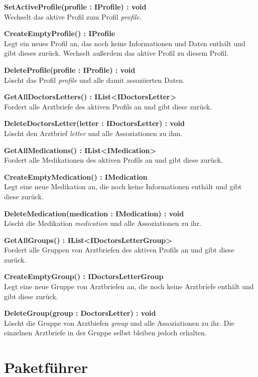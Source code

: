 \documentclass[a4paper]{scrreprt}
\begin{document}
\textbf{SetActiveProfile(profile : IProfile) : void}\\
Wechselt das aktive Profil zum Profil \textit{profile}.

\textbf{CreateEmptyProfile() : IProfile}\\
Legt ein neues Profil an, das noch keine Informationen und Daten enthält und gibt dieses zurück. Wechselt außerdem das aktive Profil zu diesem Profil.

\textbf{DeleteProfile(profile : IProfile) : void}\\
Löscht das Profil \textit{profile} und alle damit assoziierten Daten.

\textbf{GetAllDoctorsLetters() : IList<IDoctorsLetter>}\\
Fordert alle Arztbriefe des aktiven Profils an und gibt diese zurück.

\textbf{DeleteDoctorsLetter(letter : IDoctorsLetter) : void}\\
Löscht den Arztbrief \textit{letter} und alle Assoziationen zu ihm.

\textbf{GetAllMedications() : IList<IMedication>}\\
Fordert alle Medikationen des aktiven Profils an und gibt diese zurück.

\textbf{CreateEmptyMedication() : IMedication}\\
Legt eine neue Medikation an, die noch keine Informationen enthält und gibt diese zurück.

\textbf{DeleteMedication(medication : IMedication) : void}\\
Löscht die Medikation \textit{medication} und alle Assoziationen zu ihr.

\textbf{GetAllGroups() : IList<IDoctorsLetterGroup>}\\
Fordert alle Gruppen von Arztbriefen des aktiven Profils an und gibt diese zurück.

\textbf{CreateEmptyGroup() : IDoctorsLetterGroup}\\
Legt eine neue Gruppe von Arztbriefen an, die noch keine Arztbriefe enthält und gibt diese zurück.

\textbf{DeleteGroup(group : DoctorsLetter) : void}\\
Löscht die Gruppe von Arztbiefen \textit{group} und alle Assoziationen zu ihr. Die einzelnen Arztbriefe in der Gruppe selbst bleiben jedoch erhalten.

\chapter{Paketführer}
\end{document}
